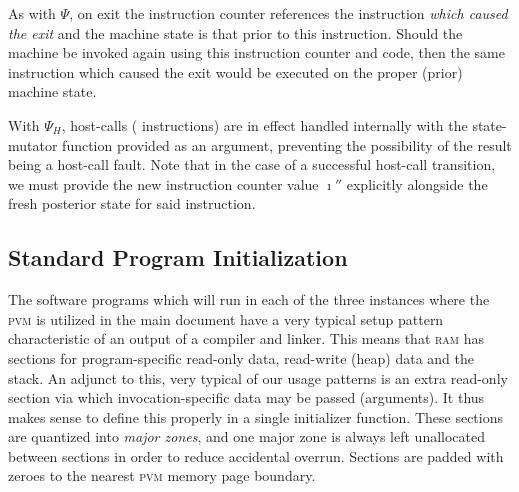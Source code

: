 As with $\Psi$, on exit the instruction counter references the instruction \emph{which caused the exit} and the machine state is that prior to this instruction. Should the machine be invoked again using this instruction counter and code, then the same instruction which caused the exit would be executed on the proper (prior) machine state.

With $\Psi_H$, host-calls (\ie {} instructions) are in effect handled internally with the state-mutator function provided as an argument, preventing the possibility of the result being a host-call fault. Note that in the case of a successful host-call transition, we must provide the new instruction counter value $\imath''$ explicitly alongside the fresh posterior state for said instruction.

\subsection{Standard Program Initialization}\label{sec:standardprograminit}
The software programs which will run in each of the three instances where the \textsc{pvm} is utilized in the main document have a very typical setup pattern characteristic of an output of a compiler and linker. This means that \textsc{ram} has sections for program-specific read-only data, read-write (heap) data and the stack. An adjunct to this, very typical of our usage patterns is an extra read-only section via which invocation-specific data may be passed (\ie arguments). It thus makes sense to define this properly in a single initializer function. These sections are quantized into \emph{major zones}, and one major zone is always left unallocated between sections in order to reduce accidental overrun. Sections are padded with zeroes to the nearest \textsc{pvm} memory page boundary.

